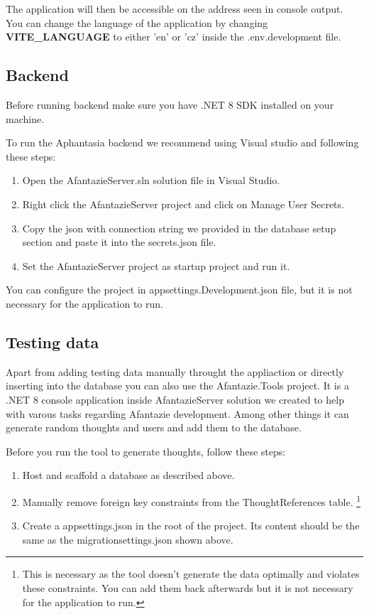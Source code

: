 The application will then be accessible on the address seen in console output.
You can change the language of the application by changing \textbf{VITE\_LANGUAGE} to either 'en' or 'cz' inside the .env.development file.

\subsection{Backend}
Before running backend make sure you have .NET 8 SDK installed on your machine.

To run the Aphantasia backend we recommend using Visual studio and following these steps:
\begin{enumerate}
  \item Open the AfantazieServer.sln solution file in Visual Studio.
  \item Right click the AfantazieServer project and click on Manage User Secrets.
  \item Copy the json with connection string we provided in the database setup section and paste it into the secrets.json file.
  \item Set the AfantazieServer project as startup project and run it.
\end{enumerate}

You can configure the project in appsettings.Development.json file,
but it is not necessary for the application to run.

\subsection{Testing data}
Apart from adding testing data manually throught the appliaction or directly inserting into the database you can also use the Afantazie.Tools project.
It is a .NET 8 console application inside AfantazieServer solution
we created to help with varous tasks regarding Afantazie development.
Among other things it can generate random thoughts and users and add them to the database.

Before you run the tool to generate thoughts, follow these steps:
\begin{enumerate}
  \item Host and scaffold a database as described above.
  \item Manually remove foreign key constraints from the ThoughtReferences table.
  \footnote{This is necessary as the tool doesn't generate the data optimally and violates these constraints.
  You can add them back afterwards but it is not necessary for the application to run.}
  \item Create a appsettings.json in the root of the project.
  Its content should be the same as the migrationsettings.json shown above.
\end{enumerate}

